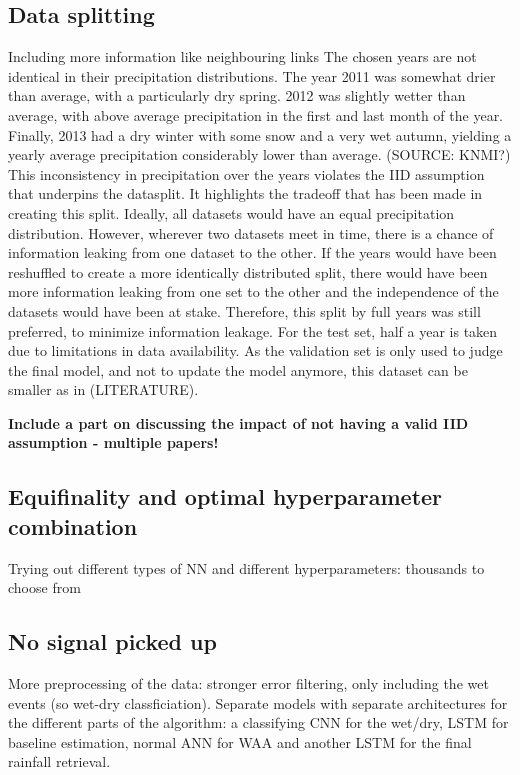 \documentclass[twocolumn, 10pt, a4paper]{memoir}
\begin{document}
	\subsection{Data splitting} \label{sec: datasplitting}
	Including more information like neighbouring links
	The chosen years are not identical in their precipitation distributions. The year 2011 was somewhat drier than average, with a particularly dry spring. 2012 was slightly wetter than average, with above average precipitation in the first and last month of the year. Finally, 2013 had a dry winter with some snow and a very wet autumn, yielding a yearly average precipitation considerably lower than average. (SOURCE: KNMI?)  
	This inconsistency in precipitation over the years violates the IID assumption that underpins the datasplit. It highlights the tradeoff that has been made in creating this split. Ideally, all datasets would have an equal precipitation distribution. However, wherever two datasets meet in time, there is a chance of information leaking from one dataset to the other. If the years would have been reshuffled to create a more identically distributed split, there would have been more information leaking from one set to the other and the independence of the datasets would have been at stake. Therefore, this split by full years was still preferred, to minimize information leakage. For the test set, half a year is taken due to limitations in data availability. As the validation set is only used to judge the final model, and not to update the model anymore, this dataset can be smaller as in (LITERATURE).
	
	\textbf{Include a part on discussing the impact of not having a valid IID assumption - multiple papers!}
	
	\subsection{Equifinality and optimal hyperparameter combination} \label{sec: Equifinality}
	Trying out different types of NN and different hyperparameters: thousands to choose from
	
	\subsection{No signal picked up} \label{sec: no results}
	More preprocessing of the data: stronger error filtering, only including the wet events (so wet-dry classficiation). Separate models with separate architectures for the different parts of the algorithm: a classifying CNN for the wet/dry, LSTM for baseline estimation, normal ANN for WAA and another LSTM for the final rainfall retrieval.
	
\end{document}
